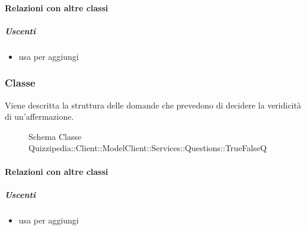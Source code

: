 \paragraph{Relazioni con altre classi}
\subparagraph{Uscenti}
\begin{itemize}
\item usa  per aggiungi
\end{itemize}
\subsubsection{Classe }
Viene descritta la struttura delle domande che prevedono di decidere la veridicità di un'affermazione.
\begin{figure}[H]
\centering
\noindent{}
\caption[Schema Classe TrueFalseQ]{Schema Classe Quizzipedia::Client::ModelClient::Services::Questions::TrueFalseQ}
\end{figure}
\paragraph{Relazioni con altre classi}
\subparagraph{Uscenti}
\begin{itemize}
\item usa  per aggiungi
\end{itemize}
